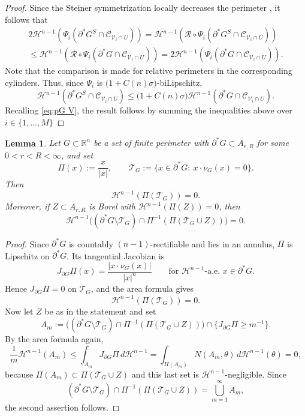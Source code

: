 \documentclass[reqno,11pt]{amsart}
\makeatletter
\def\sz{\sigma}
\newcommand{\R}{\mathbb R}
\newcommand{\HH}{\mathscr H}
\newtheorem{lem}[thm]{Lemma}%
\numberwithin{equation}{section}
\theoremstyle{remark}
\makeatother
\begin{document}
\begin{proof}
Since the Steiner symmetrization locally decreases the perimeter \cite[Theorem 14.4]{M2012}, it follows that
\begin{multline*}
2\mathscr H^{n-1}\left(\Psi_i(\partial^*G^S\cap \mathcal C_{\mathcal V_i \cap U})\right)=\mathscr H^{n-1}\left(\mathcal R\circ \Psi_i(\partial^*G^S\cap \mathcal C_{\mathcal V_i \cap U})\right)\\
\leq 
\mathscr H^{n-1}\left(\mathcal R\circ \Psi_i(\partial^*G\cap \mathcal C_{\mathcal V_i \cap U})\right)=2\mathscr H^{n-1}\left(\Psi_i(\partial^*G\cap \mathcal C_{\mathcal V_i \cap U})\right).
\end{multline*}
Note that the comparison is made for relative perimeters in the corresponding cylinders.
Thus, since $\Psi_i$ is $\big(1+C(n)\sz\big)$-biLipschitz,
$$
\mathscr H^{n-1}\left(\partial^*G^S\cap \mathcal C_{\mathcal V_i \cap U}\right) \leq \big(1+C(n)\sz\big)
\mathscr H^{n-1}\left(\partial^*G\cap \mathcal C_{\mathcal V_i \cap U}\right).
$$
Recalling \eqref{eq:pG V}, the result follows by summing the inequalities above over $i \in \{1,\ldots,M\}$
\end{proof}


\begin{lem}\label{lem:projection exceptional cone}
Let $G\subset\R^n$ be a set of finite perimeter with
$\partial^*G\subset A_{r,R}$ for some $0<r<R<\infty$, and set
\begin{equation}\label{eq:PiTG}
    \Pi(x):=\frac{x}{|x|},\qquad
\mathcal T_G:=\{x\in\partial^*G:\ x\cdot\nu_G(x)=0\}.
\end{equation}
Then
\[
\HH^{n-1}(\Pi(\mathcal T_G))=0.
\]
Moreover, if $Z\subset A_{r,R}$ is Borel with
$\HH^{n-1}(\Pi(Z))=0$, then
\[
\HH^{n-1}\big((\partial^*G\setminus \mathcal T_G)\cap
\Pi^{-1}(\Pi(\mathcal T_G\cup Z))\big)=0.
\]
\end{lem}

\begin{proof}
Since $\partial^*G$ is countably $(n-1)$-rectifiable and lies in an annulus,
$\Pi$ is Lipschitz on $\partial^*G$. Its tangential Jacobian is
\[
J_{\partial G}\Pi(x)=\frac{|x\cdot\nu_G(x)|}{|x|^n}
\qquad\text{for }\HH^{n-1}\text{-a.e. }x\in\partial^*G.
\]
Hence $J_{\partial G}\Pi=0$ on $\mathcal T_G$, and the area formula gives
\[
\HH^{n-1}(\Pi(\mathcal T_G))=0.
\]
Now let $Z$ be as in the statement and set
\[
A_m:=\big((\partial^*G\setminus \mathcal T_G)\cap\Pi^{-1}(\Pi(\mathcal T_G\cup Z))\big)
\cap\{J_{\partial G}\Pi\ge m^{-1}\}.
\]
By the area formula again,
\[
\frac1m\HH^{n-1}(A_m)
\le\int_{A_m}J_{\partial G}\Pi\,d\HH^{n-1}
=\int_{\Pi(A_m)}N(A_m,\theta)\,d\HH^{n-1}(\theta)=0,
\]
because $\Pi(A_m)\subset\Pi(\mathcal T_G\cup Z)$ and this last set is
$\HH^{n-1}$-negligible. Since
\[
(\partial^*G\setminus \mathcal T_G)\cap\Pi^{-1}(\Pi(\mathcal T_G\cup Z))
=\bigcup_{m=1}^\infty A_m,
\]
the second assertion follows.
\end{proof}
\end{document}
